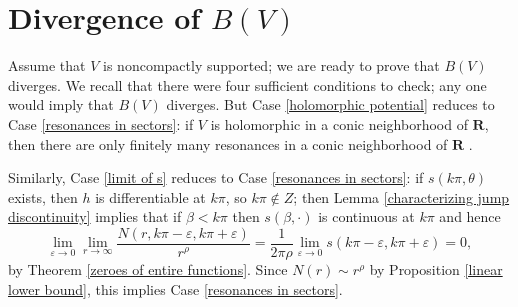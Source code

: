 \documentclass[reqno,12pt,letterpaper]{amsart}
\newcommand{\RR}{\mathbf{R}}
\newtheorem{lemma}[theorem]{Lemma}
\theoremstyle{definition}
\begin{document}
\section{Divergence of $B(V)$}
\label{divergence section}
Assume that $V$ is noncompactly supported; we are ready to prove that $B(V)$ diverges. We recall that there were four sufficient conditions to check; any one would imply that $B(V)$ diverges.
But Case \ref{holomorphic potential} reduces to Case \ref{resonances in sectors}: if $V$ is holomorphic in a conic neighborhood of $\RR$, then there are only finitely many resonances in a conic neighborhood of $\RR$ \cite[Corollary 12.14]{sjostrand2002lectures}.

Similarly, Case \ref{limit of s} reduces to Case \ref{resonances in sectors}: if $s(k\pi, \theta)$ exists, then $h$ is differentiable at $k\pi$, so $k\pi \notin Z$;
then Lemma \ref{characterizing jump discontinuity} implies that if $\beta < k\pi$ then $s(\beta, \cdot)$ is continuous at $k\pi$ and hence
$$\lim_{\varepsilon \to 0} \lim_{r \to \infty} \frac{N(r, k\pi - \varepsilon, k\pi + \varepsilon)}{r^\rho} = \frac{1}{2\pi\rho} \lim_{\varepsilon \to 0} s(k\pi - \varepsilon, k\pi + \varepsilon) = 0,$$
by Theorem \ref{zeroes of entire functions}. Since $N(r) \sim r^\rho$ by Proposition \ref{linear lower bound}, this implies Case \ref{resonances in sectors}.
%
\end{document}
